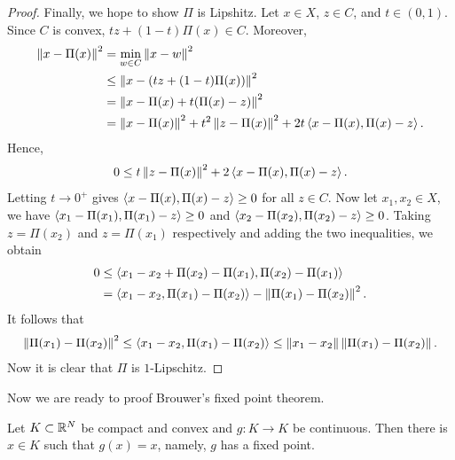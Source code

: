\documentclass[a4paper]{article}
\begin{document}
\begin{proof}
  Finally, we hope to show $\Pi$ is Lipshitz. Let $x \in X$, $z \in C$,
  and $t \in (0, 1)$. Since $C$ is convex, $tz + (1 - t) \Pi(x) \in C$.
  Moreover,
  \begin{align*}
    \left\lVert x - \Pi(x)\right\rVert^2
     & = \min_{w \in C} \left\lVert x - w\right\rVert^2                 \\
     & \leq \left\lVert x - (t z + (1 - t) \Pi(x))\right\rVert^2        \\
     & = \left\lVert x - \Pi(x) + t (\Pi(x) - z)\right\rVert^2          \\
     & = \left\lVert x - \Pi(x)\right\rVert^2 + t^2 \left\lVert z - \Pi(x)\right\rVert^2
    + 2t \left\langle x - \Pi(x), \Pi(x) - z \right\rangle.
  \end{align*}
  Hence,
  \[
    0 \leq t \left\lVert z - \Pi(x)\right\rVert^2+ 2 \left\langle x - \Pi(x), \Pi(x) - z \right\rangle.
  \]
  Letting $t \to 0^+$ gives $\left\langle x - \Pi(x), \Pi(x) - z \right\rangle \geq 0$ for
  all $z \in C$. Now let $x_1, x_2 \in X$, we have $\left\langle x_1 - \Pi(x_1),
  \Pi(x_1) - z \right\rangle \geq 0$ and $\left\langle x_2 - \Pi(x_2), \Pi(x_2) - z \right\rangle
  \geq 0$. Taking $z = \Pi(x_2)$ and $z = \Pi(x_1)$ respectively and
  adding the two inequalities, we obtain
  \begin{align*}
    0
     & \leq \left\langle x_1 - x_2 + \Pi(x_2) - \Pi(x_1), \Pi(x_2) - \Pi(x_1) \right\rangle        \\
     & = \left\langle x_1 - x_2, \Pi(x_1) - \Pi(x_2) \right\rangle - \left\lVert \Pi(x_1) - \Pi(x_2)\right\rVert^2.
  \end{align*}
  It follows that
  \begin{align*}
    \left\lVert \Pi(x_1) - \Pi(x_2)\right\rVert^2
    \leq \left\langle x_1 - x_2, \Pi(x_1) - \Pi(x_2) \right\rangle
    \leq \left\lVert x_1 - x_2\right\rVert \left\lVert \Pi(x_1) - \Pi(x_2)\right\rVert.
  \end{align*}
  Now it is clear that $\Pi$ is $1$-Lipschitz.
\end{proof}

Now we are ready to proof Brouwer's fixed point theorem.

\begin{thm}
  Let $K \subset \mathbb{R}^N$ be compact and convex and $g : K \to K$ be
  continuous. Then there is $x \in K$ such that $g(x) = x$, namely, $g$
  has a fixed point.
\end{thm}
\end{document}
